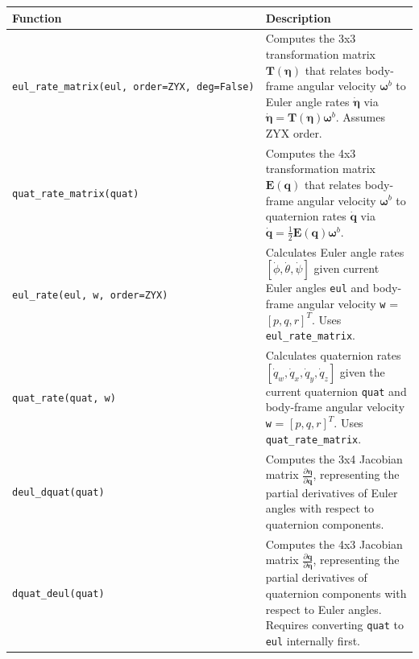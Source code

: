 \documentclass[
  letterpaper,
  DIV=11,
  numbers=noendperiod]{scrreprt}
\begin{document}
\begin{longtable}[]{@{}
  >{\raggedright\arraybackslash}p{}
  >{\raggedright\arraybackslash}p{}@{}}
\toprule\noalign{}
\begin{minipage}[b]{\linewidth}\raggedright
Function
\end{minipage} & \begin{minipage}[b]{\linewidth}\raggedright
Description
\end{minipage} \\
\midrule\noalign{}
\endhead
\bottomrule\noalign{}
\endlastfoot
\texttt{eul\_rate\_matrix(eul,\ order=\textquotesingle{}ZYX\textquotesingle{},\ deg=False)}
& Computes the 3x3 transformation matrix
\(\mathbf{T}(\boldsymbol{\eta})\) that relates body-frame angular
velocity \(\boldsymbol{\omega}^b\) to Euler angle rates
\(\dot{\boldsymbol{\eta}}\) via
\(\dot{\boldsymbol{\eta}} = \mathbf{T}(\boldsymbol{\eta}) \boldsymbol{\omega}^b\).
Assumes ZYX order. \\
\texttt{quat\_rate\_matrix(quat)} & Computes the 4x3 transformation
matrix \(\mathbf{E}(\mathbf{q})\) that relates body-frame angular
velocity \(\boldsymbol{\omega}^b\) to quaternion rates
\(\dot{\mathbf{q}}\) via
\(\dot{\mathbf{q}} = \frac{1}{2} \mathbf{E}(\mathbf{q}) \boldsymbol{\omega}^b\). \\
\texttt{eul\_rate(eul,\ w,\ order=\textquotesingle{}ZYX\textquotesingle{})}
& Calculates Euler angle rates
\([\dot{\phi}, \dot{\theta}, \dot{\psi}]\) given current Euler angles
\texttt{eul} and body-frame angular velocity \texttt{w} =
\([p, q, r]^T\). Uses \texttt{eul\_rate\_matrix}. \\
\texttt{quat\_rate(quat,\ w)} & Calculates quaternion rates
\([\dot{q}_w, \dot{q}_x, \dot{q}_y, \dot{q}_z]\) given the current
quaternion \texttt{quat} and body-frame angular velocity \texttt{w} =
\([p, q, r]^T\). Uses \texttt{quat\_rate\_matrix}. \\
\texttt{deul\_dquat(quat)} & Computes the 3x4 Jacobian matrix
\(\frac{\partial \boldsymbol{\eta}}{\partial \mathbf{q}}\), representing
the partial derivatives of Euler angles with respect to quaternion
components. \\
\texttt{dquat\_deul(quat)} & Computes the 4x3 Jacobian matrix
\(\frac{\partial \mathbf{q}}{\partial \boldsymbol{\eta}}\), representing
the partial derivatives of quaternion components with respect to Euler
angles. Requires converting \texttt{quat} to \texttt{eul} internally
first. \\
\end{longtable}
\end{document}

